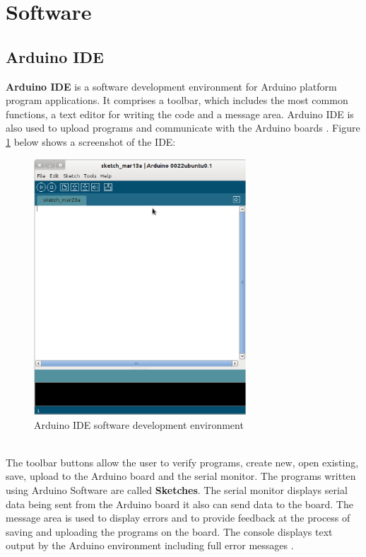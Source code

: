 \documentclass[12pt,a4paper]{report}
\begin{document}
\section{Software}
\subsection{Arduino IDE}
\textbf{Arduino IDE} is a software development environment for Arduino platform program applications.
It comprises a toolbar, which includes the most common functions, a text editor for writing the code and a message area.
Arduino IDE is also used to upload programs and communicate with the Arduino boards \cite{website:arduinosoftware}.
Figure \ref{fig:ArduinoIDE} below shows a screenshot of the IDE:
\begin{figure}[H]
    \centering
    \includegraphics*[width=300px]{arduinomain}
    \caption{Arduino IDE software development environment}
    \label{fig:ArduinoIDE}
\end{figure}
\ \\
The toolbar buttons allow the user to verify programs, create new, open existing, save, upload to the Arduino board and the serial monitor. The programs written using Arduino Software are called \textbf{Sketches}. The serial monitor displays serial data being sent from the Arduino board it also can send data to the board. The message area is used to display errors and to provide feedback at the process of saving and uploading the programs on the board. The console displays text output by the Arduino environment including full error messages \cite{website:arduinosoftware}.\\
\ \\
\end{document}
